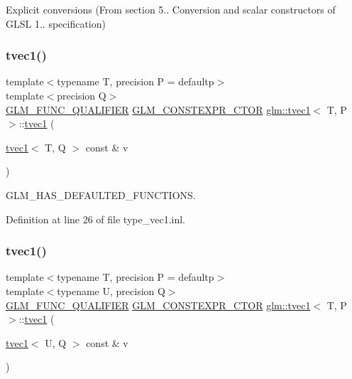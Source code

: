 Explicit conversions (From section 5.. Conversion and scalar constructors of G\+L\+SL 1.. specification) 

\mbox{\label{structglm_1_1tvec1_a3fa1c02ae48daf7eec33fa1f8ce1661f}} 
\subsubsection{\texorpdfstring{tvec1()}{tvec1()}\hspace{0.1cm}{\footnotesize\ttfamily [10/14]}}
{\footnotesize\ttfamily template$<$typename T, precision P = defaultp$>$ \\
template$<$precision Q$>$ \\
\mbox{\hyperlink{setup_8hpp_a33fdea6f91c5f834105f7415e2a64407}{G\+L\+M\+\_\+\+F\+U\+N\+C\+\_\+\+Q\+U\+A\+L\+I\+F\+I\+ER}} \mbox{\hyperlink{setup_8hpp_ad34178a09666081abdb573c14d1f4a5a}{G\+L\+M\+\_\+\+C\+O\+N\+S\+T\+E\+X\+P\+R\+\_\+\+C\+T\+OR}} \mbox{\hyperlink{structglm_1_1tvec1}{glm\+::tvec1}}$<$ T, P $>$\+::\mbox{\hyperlink{structglm_1_1tvec1}{tvec1}} (\begin{DoxyParamCaption}\item[{\mbox{\hyperlink{structglm_1_1tvec1}{tvec1}}$<$ T, Q $>$ const \&}]{v }\end{DoxyParamCaption})}



G\+L\+M\+\_\+\+H\+A\+S\+\_\+\+D\+E\+F\+A\+U\+L\+T\+E\+D\+\_\+\+F\+U\+N\+C\+T\+I\+O\+NS. 



Definition at line 26 of file type\+\_\+vec1.\+inl.

\mbox{\label{structglm_1_1tvec1_a87b45be425c692be0ff12e600c741d9c}} 
\subsubsection{\texorpdfstring{tvec1()}{tvec1()}\hspace{0.1cm}{\footnotesize\ttfamily [11/14]}}
{\footnotesize\ttfamily template$<$typename T, precision P = defaultp$>$ \\
template$<$typename U, precision Q$>$ \\
\mbox{\hyperlink{setup_8hpp_a33fdea6f91c5f834105f7415e2a64407}{G\+L\+M\+\_\+\+F\+U\+N\+C\+\_\+\+Q\+U\+A\+L\+I\+F\+I\+ER}} \mbox{\hyperlink{setup_8hpp_ad34178a09666081abdb573c14d1f4a5a}{G\+L\+M\+\_\+\+C\+O\+N\+S\+T\+E\+X\+P\+R\+\_\+\+C\+T\+OR}} \mbox{\hyperlink{structglm_1_1tvec1}{glm\+::tvec1}}$<$ T, P $>$\+::\mbox{\hyperlink{structglm_1_1tvec1}{tvec1}} (\begin{DoxyParamCaption}\item[{\mbox{\hyperlink{structglm_1_1tvec1}{tvec1}}$<$ U, Q $>$ const \&}]{v }\end{DoxyParamCaption})}




